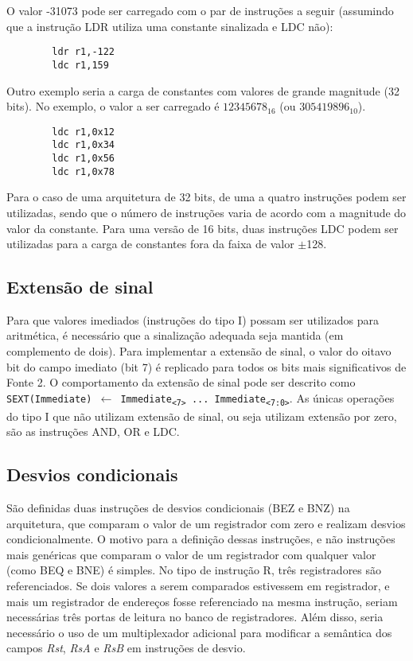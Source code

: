 \documentclass{extreport}
\begin{document}
O valor -31073 pode ser carregado com o par de instruções a seguir (assumindo que a instrução LDR utiliza uma constante sinalizada e LDC não):

\begin{verbatim}
        ldr r1,-122
        ldc r1,159
\end{verbatim}

Outro exemplo seria a carga de constantes com valores de grande magnitude (32 bits). No exemplo, o valor a ser carregado é $12345678_{16}$ (ou $305419896_{10}$).

\begin{verbatim}
        ldc r1,0x12
        ldc r1,0x34
        ldc r1,0x56
        ldc r1,0x78
\end{verbatim}

Para o caso de uma arquitetura de 32 bits, de uma a quatro instruções podem ser utilizadas, sendo que o número de instruções varia de acordo com a magnitude do valor da constante. Para uma versão de 16 bits, duas instruções LDC podem ser utilizadas para a carga de constantes fora da faixa de valor $\pm$128.

\subsection{Extensão de sinal}
\label{ref:sign_ext}
Para que valores imediados (instruções do tipo I) possam ser utilizados para aritmética, é necessário que a sinalização adequada seja mantida (em complemento de dois). Para implementar a extensão de sinal, o valor do oitavo bit do campo imediato (bit 7) é replicado para todos os bits mais significativos de Fonte 2. O comportamento da extensão de sinal pode ser descrito como \texttt{SEXT(Immediate) $\leftarrow$ Immediate\textsubscript{<7>} ... Immediate\textsubscript{<7:0>}}. As únicas operações do tipo I que não utilizam extensão de sinal, ou seja utilizam extensão por zero, são as instruções AND, OR e LDC.

\subsection{Desvios condicionais}
São definidas duas instruções de desvios condicionais (BEZ e BNZ) na arquitetura, que comparam o valor de um registrador com zero e realizam desvios condicionalmente. O motivo para a definição dessas instruções, e não instruções mais genéricas que comparam o valor de um registrador com qualquer valor (como BEQ e BNE) é simples. No tipo de instrução R, três registradores são referenciados. Se dois valores a serem comparados estivessem em registrador, e mais um registrador de endereços fosse referenciado na mesma instrução, seriam necessárias três portas de leitura no banco de registradores. Além disso, seria necessário o uso de um multiplexador adicional para modificar a semântica dos campos \textit{Rst}, \textit{RsA} e \textit{RsB} em instruções de desvio.
\end{document}
